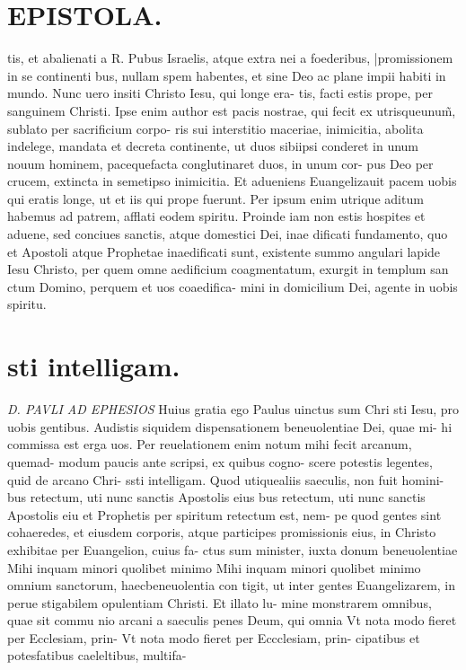 \documentclass{article}
\begin{document}
\begin{pages}
\section*{EPISTOLA. }
\marginpar{[ p.11 ]}
\marginpar{[ p.50 ]}
\marginpar{[ p.60 ]}
\marginpar{[ p.70 ]}\pstart tis, et abalienati a R. Pubus  Israelis, atque extra nei a foederibus, |promissionem in se continenti bus, nullam spem habentes, et sine Deo ac plane impii habiti in mundo.  \pend\pstart Nunc uero insiti Christo Iesu, qui longe era- tis, facti estis prope, per sanguinem Christi. Ipse enim author est pacis nostrae, qui fecit ex utrisqueunum̃, sublato per sacrificium corpo- ris sui interstitio maceriae, inimicitia, abolita indelege, mandata et decreta continente, ut duos sibiipsi conderet in unum nouum hominem, pacequefacta conglutinaret duos, in unum cor- pus Deo per crucem, extincta in semetipso inimicitia.  \pend\pstart Et adueniens Euangelizauit pacem uobis qui eratis longe, ut et iis qui prope fuerunt. Per ipsum enim utrique aditum habemus ad patrem, afflati eodem spiritu.  \pend\pstart Proinde iam non estis hospites et aduene, sed conciues sanctis, atque domestici Dei, inae dificati fundamento, quo et Apostoli atque Prophetae inaedificati sunt, existente summo angulari lapide Iesu Christo, per quem omne aedificium coagmentatum, exurgit in templum san ctum Domino, perquem et uos coaedifica- mini in domicilium Dei, agente in uobis spiritu.  \pend
\section*{sti intelligam. }
\marginpar{[ p.1. ]}
\textit{D. PAVLI AD EPHESIOS }\pstart Huius gratia ego Paulus uinctus sum Chri sti Iesu, pro uobis gentibus.  Audistis siquidem dispensationem beneuolentiae Dei, quae mi- hi commissa est erga uos. Per reuelationem enim notum mihi fecit arcanum, quemad- modum paucis ante scripsi, ex quibus  cogno- scere potestis legentes, quid de arcano Chri- ssti intelligam.  \pend\pstart Quod utiquealiis saeculis, non fuit homini- bus retectum, uti nunc sanctis Apostolis eius bus retectum, uti nunc sanctis Apostolis eiu et Prophetis per spiritum retectum est, nem- pe quod gentes sint cohaeredes, et eiusdem corporis, atque participes promissionis eius, in Christo exhibitae per Euangelion, cuius fa- ctus sum minister, iuxta donum beneuolentiae  \pend\pstart Mihi inquam minori quolibet minimo Mihi inquam minori quolibet minimo omnium sanctorum, haecbeneuolentia con tigit, ut inter gentes Euangelizarem, in perue stigabilem opulentiam Christi. Et illato lu- mine monstrarem omnibus, quae sit commu nio arcani a saeculis penes Deum, qui omnia  \pend\pstart Vt nota modo fieret per Ecclesiam, prin- Vt nota modo fieret per Eccclesiam, prin- cipatibus et potesfatibus caeleltibus, multifa-  \pend

\end{pages}
\end{document}
